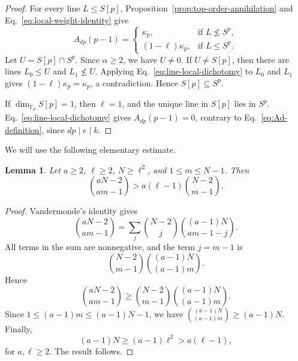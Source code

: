 \documentclass[11pt]{article}
\newtheorem{lemma}[theorem]{Lemma}
\theoremstyle{definition}
\begin{document}
\begin{proof}
	For every line \(L\le S[p]\), Proposition~\ref{prop:top-order-annihilation}
	and Eq.~\eqref{eq:local-weight-identity} give
	\begin{equation}\label{eq:line-local-dichotomy}
		A_{dp}(p-1)
		=
		\begin{cases}
			\kappa_p,
			&\text{if }L\nleq S^p,\\[1mm]
			(1-\ell)\kappa_p,
			&\text{if }L\le S^p.
		\end{cases}
	\end{equation}
	Let \(U=S[p]\cap S^p\).  Since \(\alpha\ge2\), we have \(U\ne 0\).  If
	\(U\ne S[p]\), then there are lines \(L_0\le U\) and \(L_1\nleq U\).
	Applying Eq.~\eqref{eq:line-local-dichotomy} to \(L_0\) and \(L_1\) gives
	\((1-\ell)\kappa_p=\kappa_p\), a contradiction.  Hence \(S[p]\subseteq S^p\).
	
	If \(\dim_{\mathbb F_p}S[p]=1\), then \(\ell=1\), and the unique line in
	\(S[p]\) lies in \(S^p\).  Eq.~\eqref{eq:line-local-dichotomy} gives
	\(A_{dp}(p-1)=0\), contrary to Eq.~\eqref{eq:Ad-definition}, since
	\(dp\mid e\mid k\).
\end{proof}

We will use the following elementary estimate.

\begin{lemma}\label{lem:binomial-estimate}
	Let \(a\ge2\), \(\ell\ge2\), \(N\ge \ell^2\), and
	\(1\le m\le N-1\).  Then
	\[
	\binom{aN-2}{am-1}
	>
	a(\ell-1)\binom{N-2}{m-1}.
	\]
\end{lemma}

\begin{proof}
	Vandermonde's identity gives
	\[
	\binom{aN-2}{am-1}
	=
	\sum_j
	\binom{N-2}{j}
	\binom{(a-1)N}{am-1-j}.
	\]
	All terms in the sum are nonnegative, and the term \(j=m-1\) is
	\[
	\binom{N-2}{m-1}
	\binom{(a-1)N}{(a-1)m}.
	\]
	Hence
	\[
	\binom{aN-2}{am-1}
	\ge
	\binom{N-2}{m-1}
	\binom{(a-1)N}{(a-1)m}.
	\]
	Since \(1\le (a-1)m\le (a-1)N-1\), we have
	\(\binom{(a-1)N}{(a-1)m}\ge (a-1)N\).  Finally,
	\[
	(a-1)N\ge (a-1)\ell^2>a(\ell-1),
	\]
	for \(a,\ell\ge2\).  The result follows.
\end{proof}
\end{document}
